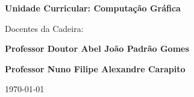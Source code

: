 \vspace{0.2cm}
\begin{center}
\begin{large}
\textbf{Unidade Curricular: Computação Gráfica}
\end{large}
\end{center}

\vspace{0,3cm}
\begin{center}
\begin{normalsize}
\begin{large}
Docentes da Cadeira:
\end{large}
\end{normalsize}
\end{center}

\begin{center}
\begin{large}
\textbf{Professor Doutor Abel João Padrão Gomes}
\end{large}
\end{center}


\begin{center}
\begin{large}
\textbf{Professor Nuno Filipe Alexandre Carapito}
\end{large}
\end{center}

\vspace{0.5cm}
\begin{center}
\begin{normalsize}
\today
\end{normalsize}
\end{center}
